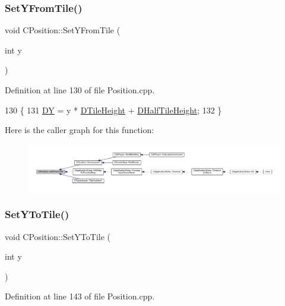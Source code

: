 \subsubsection{\texorpdfstring{Set\+Y\+From\+Tile()}{SetYFromTile()}}
{\footnotesize\ttfamily void C\+Position\+::\+Set\+Y\+From\+Tile (\begin{DoxyParamCaption}\item[{int}]{y }\end{DoxyParamCaption})}



Definition at line 130 of file Position.\+cpp.


\begin{DoxyCode}
130                                  \{
131     \hyperlink{classCPosition_a84139c9e8eb547e7cf3cb851739943a4}{DY} = y * \hyperlink{classCPosition_a202ebb83e86df75cfb76cf1241ba817c}{DTileHeight} + \hyperlink{classCPosition_a1e0af68f7690b3cfc14687cf7fbe7ade}{DHalfTileHeight};
132 \}
\end{DoxyCode}
Here is the caller graph for this function\+:
\nopagebreak
\begin{figure}[H]
\begin{center}
\leavevmode
\includegraphics[width=350pt]{classCPosition_a4be1caa5ce58297e9d371f6bc1db32d9_icgraph}
\end{center}
\end{figure}
\hypertarget{classCPosition_a5805485f623398197ac595a5d389f691}{}\label{classCPosition_a5805485f623398197ac595a5d389f691} 
\subsubsection{\texorpdfstring{Set\+Y\+To\+Tile()}{SetYToTile()}}
{\footnotesize\ttfamily void C\+Position\+::\+Set\+Y\+To\+Tile (\begin{DoxyParamCaption}\item[{int}]{y }\end{DoxyParamCaption})}



Definition at line 143 of file Position.\+cpp.


